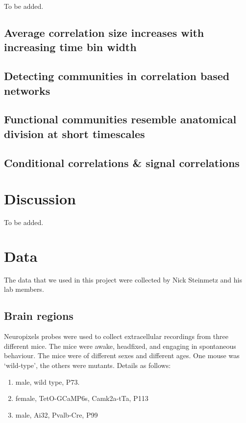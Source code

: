 \documentclass[a4paper,12pt]{article}
\theoremstyle{definition}
\begin{document}
To be added.

  \subsection{Average correlation size increases with increasing time bin width}

  \subsection{Detecting communities in correlation based networks}

  \subsection{Functional communities resemble anatomical division at short timescales}

  \subsection{Conditional correlations \& signal correlations}

\section{Discussion}
To be added.

\section{Data}

    The data that we used in this project were collected by Nick Steinmetz and his lab members\cite{stringer}.

    \subsection{Brain regions}
    Neuropixels probes were used to collect extracellular recordings \cite{jun} from three different mice. The mice were awake, headfixed, and engaging in spontaneous behaviour. The mice were of different sexes and different ages. One mouse was `wild-type', the others were mutants. Details as follows:
    \begin{enumerate}
        \item male, wild type, P73. %
        \item female, TetO-GCaMP6s, Camk2a-tTa, P113 %
        \item male, Ai32, Pvalb-Cre, P99 %
    \end{enumerate}
\end{document}
